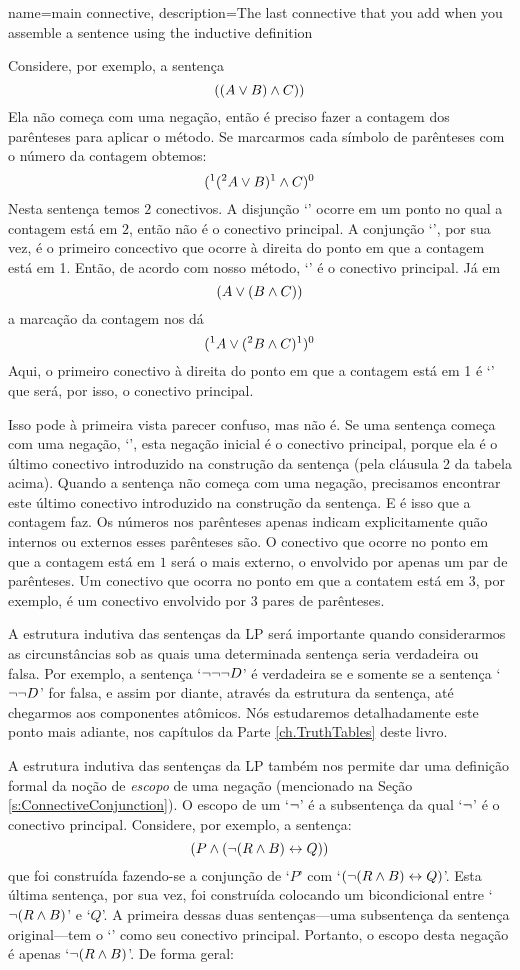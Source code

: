 {
name=main connective,
description={The last connective that you add when you assemble a sentence using the inductive definition}
}

Considere, por exemplo, a sentença
$$((A \vee B) \wedge C))$$
Ela não começa com uma negação, então é preciso fazer a contagem dos parênteses para aplicar o método.
Se marcarmos cada símbolo de parênteses com o número da contagem obtemos:
$$(^1 (^2 A \vee B)^1 \wedge C)^0$$
Nesta sentença temos $2$ conectivos.
A disjunção `\eor' ocorre em um ponto no qual a contagem está em $2$, então não é o conectivo principal.
A conjunção `\eand', por sua vez, é o primeiro concectivo que ocorre à direita do ponto em que a contagem está em 1.
Então, de acordo com nosso método, `\eand' é o conectivo principal.
Já em
$$(A \vee (B \wedge C))$$
a marcação da contagem nos dá
$$(^1 A \vee (^2 B \wedge C)^1 )^0$$
Aqui, o primeiro conectivo à direita do ponto em que a contagem está em 1 é `\eor' que será, por isso, o conectivo principal.

Isso pode à primeira vista parecer confuso, mas não é.
Se uma sentença começa com uma negação, `\enot', esta negação inicial é o conectivo principal, porque ela é o último conectivo introduzido na construção da sentença (pela cláusula 2 da tabela acima).
Quando a sentença não começa com uma negação, precisamos encontrar este último conectivo introduzido na construção da sentença.
E é isso que a contagem faz.
Os números nos parênteses apenas indicam explicitamente quão internos ou externos esses parênteses são.
O conectivo que ocorre no ponto em que a contagem está em $1$ será o mais externo, o envolvido por apenas um par de parênteses.
Um conectivo que ocorra no ponto em que a contatem está em $3$, por exemplo, é um conectivo envolvido por 3 pares de parênteses.
 
A estrutura indutiva das sentenças da LP será importante quando considerarmos as circunstâncias sob as quais uma determinada sentença seria verdadeira ou falsa.
Por exemplo, a sentença `$\neg\neg\neg D$' é verdadeira se e somente se a sentença `$\neg\neg D$' for falsa, e assim por diante, através da estrutura da sentença, até chegarmos aos componentes atômicos.
Nós estudaremos detalhadamente este ponto mais adiante, nos capítulos da Parte \ref{ch.TruthTables} deste livro.

A estrutura indutiva das sentenças da LP também nos permite dar uma definição formal da noção de \emph{escopo} de uma negação (mencionado na Seção  \ref{s:ConnectiveConjunction}).
O escopo de um `$\neg$' é a subsentença da qual `$\neg$' é o conectivo principal.
Considere, por exemplo, a sentença:
$$(P \wedge (\neg (R \wedge B) \leftrightarrow Q))$$
que foi construída fazendo-se a conjunção de `$P$' com \mbox{`$(\neg(R \wedge B) \leftrightarrow Q)$'}.
Esta última sentença, por sua vez, foi construída colocando um bicondicional entre `$\neg(R \wedge B)$' e `$Q$'.
A primeira dessas duas sentenças---uma subsentença da sentença original---tem o `\enot' como seu conectivo principal.
Portanto, o escopo desta negação é apenas `$\neg(R \wedge B)$'.
De forma geral:


